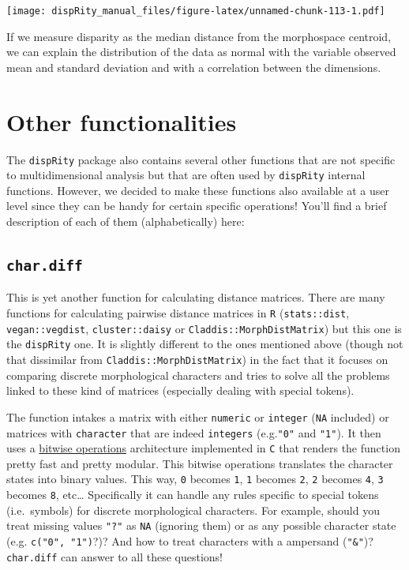\documentclass[]{book}
\begin{document}
\texttt{[image: dispRity\_manual\_files/figure-latex/unnamed-chunk-113-1.pdf]}

If we measure disparity as the median distance from the morphospace centroid, we can explain the distribution of the data as normal with the variable observed mean and standard deviation and with a correlation between the dimensions.

\hypertarget{other-functionalities}{%
\chapter{Other functionalities}\label{other-functionalities}}

The \texttt{dispRity} package also contains several other functions that are not specific to multidimensional analysis but that are often used by \texttt{dispRity} internal functions.
However, we decided to make these functions also available at a user level since they can be handy for certain specific operations!
You'll find a brief description of each of them (alphabetically) here:

\hypertarget{char.diff}{%
\section{\texorpdfstring{\texttt{char.diff}}{char.diff}}\label{char.diff}}

This is yet another function for calculating distance matrices.
There are many functions for calculating pairwise distance matrices in \texttt{R} (\texttt{stats::dist}, \texttt{vegan::vegdist}, \texttt{cluster::daisy} or \texttt{Claddis::MorphDistMatrix}) but this one is the \texttt{dispRity} one.
It is slightly different to the ones mentioned above (though not that dissimilar from \texttt{Claddis::MorphDistMatrix}) in the fact that it focuses on comparing discrete morphological characters and tries to solve all the problems linked to these kind of matrices (especially dealing with special tokens).

The function intakes a matrix with either \texttt{numeric} or \texttt{integer} (\texttt{NA} included) or matrices with \texttt{character} that are indeed \texttt{integers} (e.g.\texttt{"0"} and \texttt{"1"}).
It then uses a \href{https://en.wikipedia.org/wiki/Bitwise_operations_in_C}{bitwise operations} architecture implemented in \texttt{C} that renders the function pretty fast and pretty modular.
This bitwise operations translates the character states into binary values.
This way, \texttt{0} becomes \texttt{1}, \texttt{1} becomes \texttt{2}, \texttt{2} becomes \texttt{4}, \texttt{3} becomes \texttt{8}, etc\ldots{}
Specifically it can handle any rules specific to special tokens (i.e.~symbols) for discrete morphological characters. For example, should you treat missing values \texttt{"?"} as \texttt{NA} (ignoring them) or as any possible character state (e.g. \texttt{c("0",\ "1")}?)? And how to treat characters with a ampersand (\texttt{"\&"})? \texttt{char.diff} can answer to all these questions!
\end{document}
